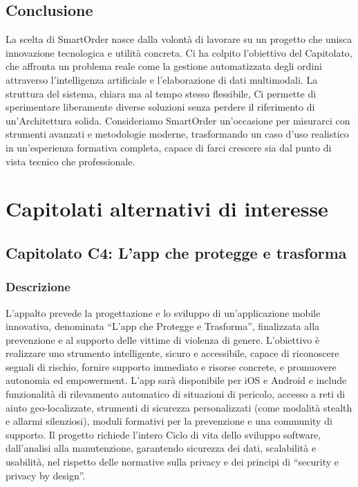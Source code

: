 \documentclass[a4paper,12pt]{article}
\begin{document}
\subsection{Conclusione}
La scelta di SmartOrder nasce dalla volontà di lavorare su un progetto che unisca innovazione tecnologica e utilità concreta. Ci ha colpito l’obiettivo del Capitolato, che affronta un problema reale come la gestione automatizzata degli ordini attraverso l’intelligenza artificiale e l’elaborazione di dati multimodali. La struttura del sistema, chiara ma al tempo stesso flessibile, Ci permette di sperimentare liberamente diverse soluzioni senza perdere il riferimento di un’Architettura solida. Consideriamo SmartOrder un’occasione per misurarci con strumenti avanzati e metodologie moderne, trasformando un caso d’uso realistico in un’esperienza formativa completa, capace di farci crescere sia dal punto di vista tecnico che professionale.

\section{Capitolati alternativi di interesse}

\subsection{Capitolato C4: L’app che protegge e trasforma}

\subsubsection{Descrizione}
L’appalto prevede la progettazione e lo sviluppo di un’applicazione mobile innovativa, denominata “L’app che Protegge e Trasforma”, finalizzata alla prevenzione e al supporto delle vittime di violenza di genere. L’obiettivo è realizzare uno strumento intelligente, sicuro e accessibile, capace di riconoscere segnali di rischio, fornire supporto immediato e risorse concrete, e promuovere autonomia ed empowerment.
L’app sarà disponibile per iOS e Android e include funzionalità di rilevamento automatico di situazioni di pericolo, accesso a reti di aiuto geo-localizzate, strumenti di sicurezza personalizzati (come modalità stealth e allarmi silenziosi), moduli formativi per la prevenzione e una community di supporto.
Il progetto richiede l’intero Ciclo di vita dello sviluppo software, dall’analisi alla manutenzione, garantendo sicurezza dei dati, scalabilità e usabilità, nel rispetto delle normative sulla privacy e dei principi di “security e privacy by design”.
\end{document}
